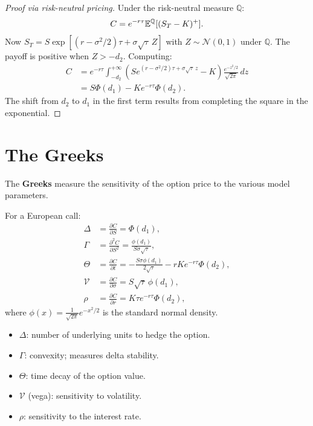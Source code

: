\begin{proof}[Proof via risk-neutral pricing]
Under the risk-neutral measure $\mathbb{Q}$:
\[
    C = e^{-r\tau}\mathbb{E}^\mathbb{Q}[(S_T - K)^+].
\]
Now $S_T = S\exp\!\left[(r - \sigma^2/2)\tau + \sigma\sqrt{\tau}\,Z\right]$
with $Z \sim \mathcal{N}(0,1)$ under $\mathbb{Q}$. The payoff is positive
when $Z > -d_2$. Computing:
\begin{align*}
    C &= e^{-r\tau}\int_{-d_2}^{+\infty}
         \left(Se^{(r-\sigma^2/2)\tau + \sigma\sqrt{\tau}\,z} - K\right)
         \frac{e^{-z^2/2}}{\sqrt{2\pi}}\,dz \\
      &= S\Phi(d_1) - Ke^{-r\tau}\Phi(d_2).
\end{align*}
The shift from $d_2$ to $d_1$ in the first term results from completing
the square in the exponential.
\end{proof}

\section{The Greeks}

The \textbf{Greeks} measure the sensitivity of the option price to the
various model parameters.

\begin{definition}
For a European call:
\begin{align*}
    \Delta &= \frac{\partial C}{\partial S} = \Phi(d_1), \\
    \Gamma &= \frac{\partial^2 C}{\partial S^2}
            = \frac{\phi(d_1)}{S\sigma\sqrt{\tau}}, \\
    \Theta &= \frac{\partial C}{\partial t}
            = -\frac{S\sigma\phi(d_1)}{2\sqrt{\tau}} - rKe^{-r\tau}\Phi(d_2), \\
    \mathcal{V} &= \frac{\partial C}{\partial \sigma}
                  = S\sqrt{\tau}\,\phi(d_1), \\
    \rho &= \frac{\partial C}{\partial r} = K\tau e^{-r\tau}\Phi(d_2),
\end{align*}
where $\phi(x) = \frac{1}{\sqrt{2\pi}}e^{-x^2/2}$ is the standard normal
density.
\end{definition}

\begin{intuition}[title=\textbf{Interpreting the Greeks}]
\begin{itemize}
    \item $\Delta$: number of underlying units to hedge the option.
    \item $\Gamma$: convexity; measures delta stability.
    \item $\Theta$: time decay of the option value.
    \item $\mathcal{V}$ (vega): sensitivity to volatility.
    \item $\rho$: sensitivity to the interest rate.
\end{itemize}
\end{intuition}

